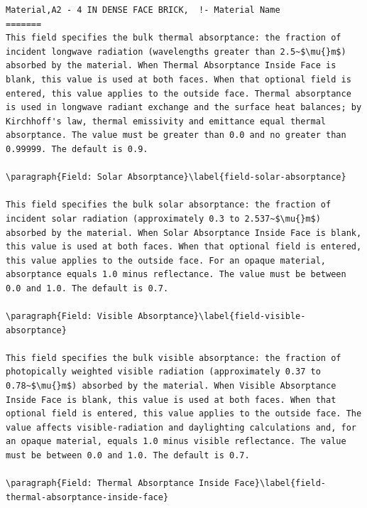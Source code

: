 \begin{lstlisting}
Material,A2 - 4 IN DENSE FACE BRICK,  !- Material Name
=======
This field specifies the bulk thermal absorptance: the fraction of incident longwave radiation (wavelengths greater than 2.5~$\mu{}m$) absorbed by the material. When Thermal Absorptance Inside Face is blank, this value is used at both faces. When that optional field is entered, this value applies to the outside face. Thermal absorptance is used in longwave radiant exchange and the surface heat balances; by Kirchhoff's law, thermal emissivity and emittance equal thermal absorptance. The value must be greater than 0.0 and no greater than 0.99999. The default is 0.9.

\paragraph{Field: Solar Absorptance}\label{field-solar-absorptance}

This field specifies the bulk solar absorptance: the fraction of incident solar radiation (approximately 0.3 to 2.537~$\mu{}m$) absorbed by the material. When Solar Absorptance Inside Face is blank, this value is used at both faces. When that optional field is entered, this value applies to the outside face. For an opaque material, absorptance equals 1.0 minus reflectance. The value must be between 0.0 and 1.0. The default is 0.7.

\paragraph{Field: Visible Absorptance}\label{field-visible-absorptance}

This field specifies the bulk visible absorptance: the fraction of photopically weighted visible radiation (approximately 0.37 to 0.78~$\mu{}m$) absorbed by the material. When Visible Absorptance Inside Face is blank, this value is used at both faces. When that optional field is entered, this value applies to the outside face. The value affects visible-radiation and daylighting calculations and, for an opaque material, equals 1.0 minus visible reflectance. The value must be between 0.0 and 1.0. The default is 0.7.

\paragraph{Field: Thermal Absorptance Inside Face}\label{field-thermal-absorptance-inside-face}


\end{lstlisting}
